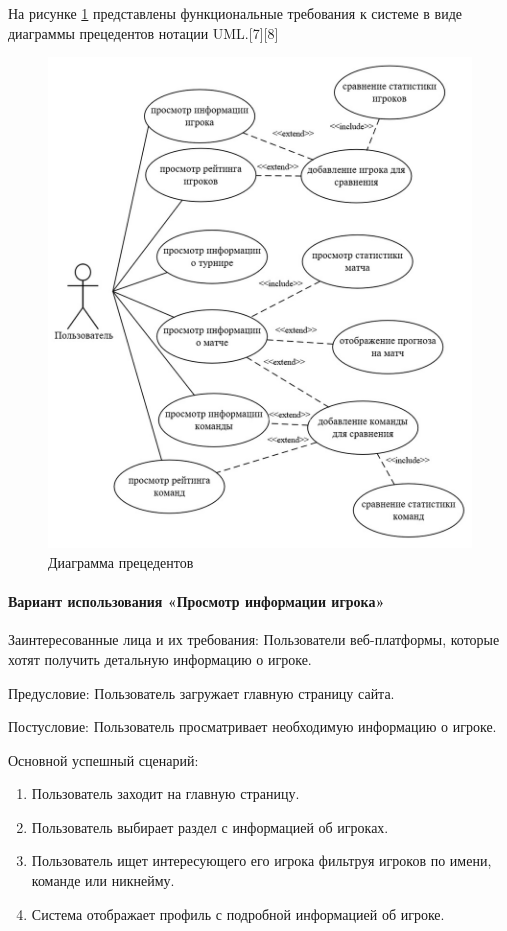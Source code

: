 На рисунке \ref{fig:-use_case_diagram} представлены функциональные требования к системе в виде диаграммы прецедентов нотации UML.[7][8]
\begin{figure}
	\centering
	\includegraphics[width=0.9\linewidth]{"images/Диаграмма прецедентов"}
	\caption{Диаграмма прецедентов}
	\label{fig:-use_case_diagram}
\end{figure}

\paragraph{Вариант использования «Просмотр информации игрока»}

Заинтересованные лица и их требования: Пользователи веб-платформы, которые хотят получить детальную информацию о игроке.

Предусловие: Пользователь загружает главную страницу сайта.

Постусловие: Пользователь просматривает необходимую информацию о игроке.

Основной успешный сценарий:
\begin{enumerate}
	\item Пользователь заходит на главную страницу.
	\item Пользователь выбирает раздел с информацией об игроках.
	\item Пользователь ищет интересующего его игрока фильтруя игроков по имени, команде или никнейму.
	\item Система отображает профиль с подробной информацией об игроке.
\end{enumerate}


